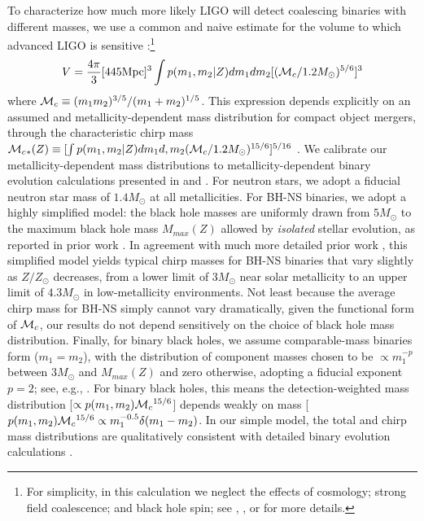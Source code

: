 \documentclass[nofootinbib,twocolumn,prd]{emulateapj}
\newcommand\mc{{\cal M}_c{}}
\newcommand\unit[1]{\text{#1}}
\begin{document}
\begin{widetext}
To characterize how much more likely LIGO will detect coalescing binaries with different masses, we use a common and
naive estimate for the volume to which advanced LIGO is sensitive \citep[see,e.g.,][]{PSellipticals}:\footnote{For
  simplicity, in this calculation we neglect the effects of cosmology; strong field coalescence; and black hole spin;
  see \cite{popsyn-LowMetallicityImpact2c-StarTrackRevised-2014}, \cite{AstroPaper}, or \cite{RatesPaper} for more details.}
\begin{eqnarray}
V = \frac{4\pi}{3} [445 \unit{Mpc}]^3 \int p(m_1,m_2|Z) dm_1 dm_2 [ (\mc/1.2 M_\odot)^{5/6}]^3
\end{eqnarray}
where $\mc\equiv (m_1 m_2)^{3/5}/(m_1+m_2)^{1/5}$.   
This expression depends explicitly on an assumed and metallicity-dependent mass distribution for compact object
mergers, through the characteristic chirp mass $\mc_{*}(Z)\equiv [\int p(m_1,m_2|Z) dm_1 d,m_2 (\mc/1.2
  M_\odot)^{15/6}]^{5/16}$ .  We calibrate our metallicity-dependent mass distributions to metallicity-dependent binary
evolution calculations presented in \cite{popsyn-LowMetallicityImpact2-StarTrackRevised-2012} and
\cite{popsyn-LowMetallicityImpact2c-StarTrackRevised-2014}.  For neutron
stars, we adopt a fiducial neutron star mass of $1.4 M_\odot$ at all metallicities.  For BH-NS binaries, we adopt a
highly simplified model: the black hole masses are uniformly  drawn from $5 M_\odot$ to the maximum 
black hole mass $M_{max}(Z)$ allowed by
\emph{isolated} stellar evolution, as reported in prior work \citep[see,e.g.][and references
  therein]{gwastro-EventPopsynPaper-2016}.  In agreement with much more detailed prior work \cite{popsyn-LowMetallicityImpact2c-StarTrackRevised-2014}, this simplified model yields typical chirp masses for BH-NS binaries that
vary slightly as $Z/Z_\odot$ decreases, from a lower limit of $3 M_\odot$ near solar metallicity to an upper limit of
$4.3 M_\odot$ in low-metallicity environments.  Not least because the average chirp mass for BH-NS simply cannot vary
dramatically, given the functional form of $\mc$, our results do not depend sensitively on the choice of black hole mass
distribution.  Finally, for binary black holes, we assume  comparable-mass binaries
form ($m_1=m_2$), with the distribution of component masses chosen to be $\propto m_1^{-p}$ 
 between $3 M_\odot$ and $M_{max}(Z)$ and zero otherwise, adopting a fiducial exponent $p=2$; see, e.g.,
\cite{popsyn-LowMetallicityImpact2b-StarTrackRevised-2013}.    For binary black holes, this means  the
detection-weighted mass distribution [$\propto p(m_1,m_2)
\mc^{15/6}$] depends weakly on mass [$ p(m_1,m_2)
\mc^{15/6} \propto m_1^{-0.5} \delta(m_1-m_2)$.  In our simple model, the total  and chirp mass
distributions   are qualitatively consistent with detailed  binary evolution calculations \citep{popsyn-LowMetallicityImpact2b-StarTrackRevised-2013}. 

\end{widetext}
\end{document}
